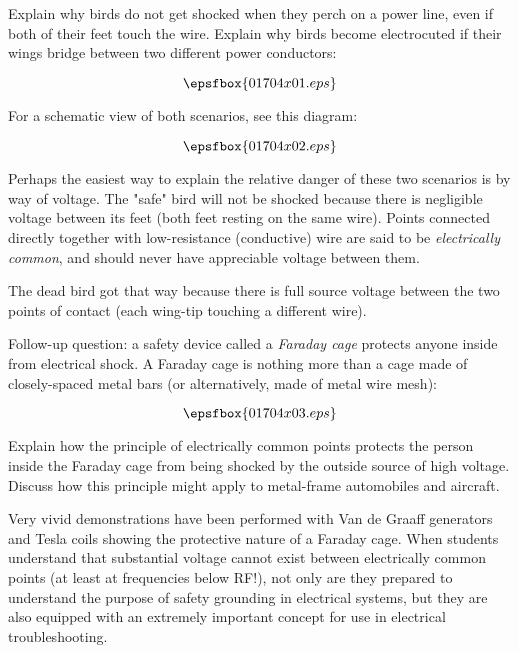 

Explain why birds do not get shocked when they perch on a power line, even if both of their feet touch the wire.  Explain why birds become electrocuted if their wings bridge between two different power conductors:

$$\epsfbox{01704x01.eps}$$

For a schematic view of both scenarios, see this diagram:

$$\epsfbox{01704x02.eps}$$







Perhaps the easiest way to explain the relative danger of these two scenarios is by way of voltage.  The "safe" bird will not be shocked because there is negligible voltage between its feet (both feet resting on the same wire).  Points connected directly together with low-resistance (conductive) wire are said to be {\it electrically common}, and should never have appreciable voltage between them.

The dead bird got that way because there is full source voltage between the two points of contact (each wing-tip touching a different wire).

\vskip 10pt

Follow-up question: a safety device called a {\it Faraday cage} protects anyone inside from electrical shock.  A Faraday cage is nothing more than a cage made of closely-spaced metal bars (or alternatively, made of metal wire mesh):

$$\epsfbox{01704x03.eps}$$

Explain how the principle of electrically common points protects the person inside the Faraday cage from being shocked by the outside source of high voltage.  Discuss how this principle might apply to metal-frame automobiles and aircraft.







Very vivid demonstrations have been performed with Van de Graaff generators and Tesla coils showing the protective nature of a Faraday cage.  When students understand that substantial voltage cannot exist between electrically common points (at least at frequencies below RF!), not only are they prepared to understand the purpose of safety grounding in electrical systems, but they are also equipped with an extremely important concept for use in electrical troubleshooting.




